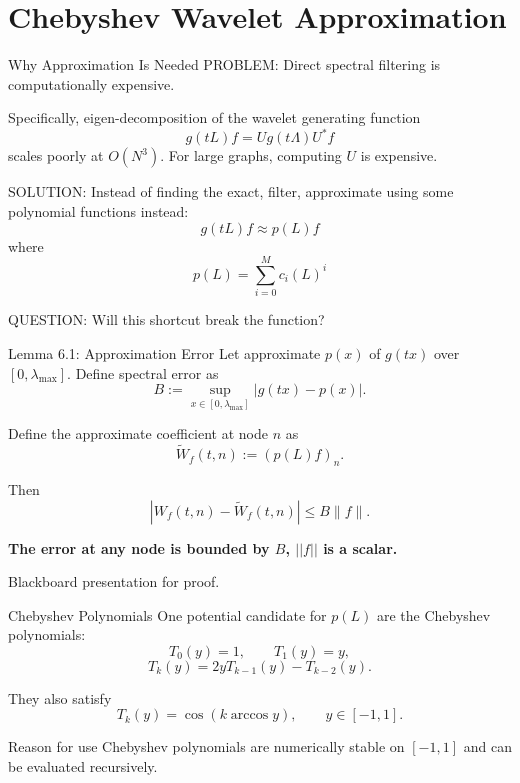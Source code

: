 \documentclass[aspectratio=1610,xcolor=dvipsnames,t]{beamer}
\newcommand{\keyterm}[1]{\textcolor{unirot}{\textbf{#1}}}
\begin{document}
\section[Approximation]{Chebyshev Wavelet Approximation}

\begin{frame}{Why Approximation Is Needed}
PROBLEM: Direct spectral filtering is computationally expensive.

Specifically, eigen-decomposition of the wavelet generating function
$$g(tL)f=Ug(t\Lambda)U^*f$$
scales poorly at $O(N^3)$. For large graphs, computing $U$ is expensive.

\medskip
SOLUTION: Instead of finding the exact, filter, approximate using some polynomial functions instead: 
$$g(tL)f\approx p(L)f$$
where
$$p(L)=\sum_{i=0}^M c_i(L)^i$$

\medskip
QUESTION: Will this shortcut break the function?
\end{frame}

\begin{frame}{Lemma 6.1: Approximation Error}
Let approximate $p(x)$ of $g(tx)$ over $[0,\lambda_{\max}]$. Define spectral error as
$$B:=\sup_{x\in[0,\lambda_{\max}]}|g(tx)-p(x)|.$$

Define the approximate coefficient at node $n$ as
$$\widetilde{W}_f(t,n):=(p(L)f)_n.$$

Then
\[
|W_f(t,n)-\widetilde W_f(t,n)|\leq B\|f\|.
\tag{SGWT Eq. 53}
\]

\begin{center}
\keyterm{The error at any node is bounded by $B$, $||f||$ is a scalar.}

\medskip
Blackboard presentation for proof.
\end{center}
\end{frame}

\begin{frame}{Chebyshev Polynomials}
One potential candidate for $p(L)$ are the Chebyshev polynomials:
\[
T_0(y)=1,
\qquad
T_1(y)=y,
\]
\[
T_k(y)=2yT_{k-1}(y)-T_{k-2}(y).
\]

They also satisfy
\[
T_k(y)=\cos(k\arccos y),
\qquad y\in[-1,1].
\]

\begin{block}{Reason for use}
Chebyshev polynomials are numerically stable on $[-1,1]$ and can be evaluated recursively.
\end{block}
\end{frame}
\end{document}
